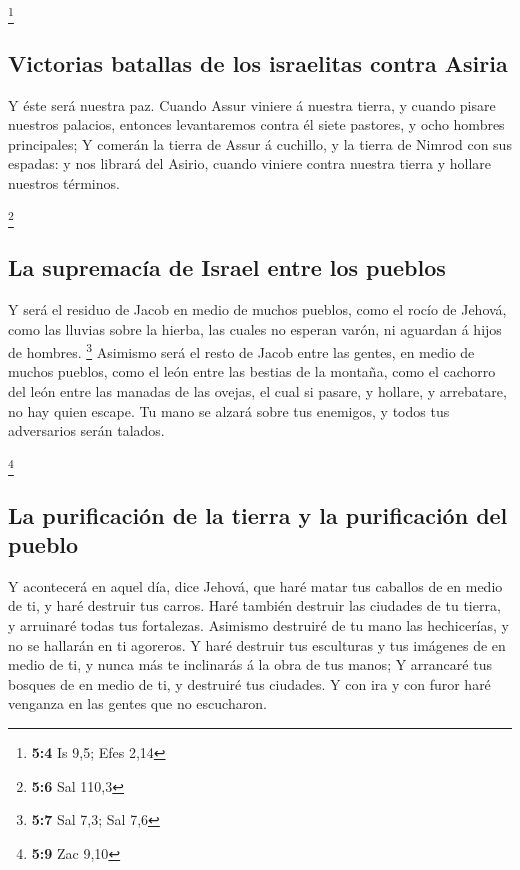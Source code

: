 \footnote{\textbf{5:4} Is 9,5; Efes 2,14}

\hypertarget{victorias-batallas-de-los-israelitas-contra-asiria}{%
\subsection{Victorias batallas de los israelitas contra
Asiria}\label{victorias-batallas-de-los-israelitas-contra-asiria}}

 Y éste será nuestra paz. Cuando Assur viniere á nuestra
tierra, y cuando pisare nuestros palacios, entonces levantaremos contra
él siete pastores, y ocho hombres principales;  Y comerán la
tierra de Assur á cuchillo, y la tierra de Nimrod con sus espadas: y nos
librará del Asirio, cuando viniere contra nuestra tierra y hollare
nuestros términos.

\footnote{\textbf{5:6} Sal 110,3}

\hypertarget{la-supremacuxeda-de-israel-entre-los-pueblos}{%
\subsection{La supremacía de Israel entre los
pueblos}\label{la-supremacuxeda-de-israel-entre-los-pueblos}}

 Y será el residuo de Jacob en medio de muchos pueblos, como
el rocío de Jehová, como las lluvias sobre la hierba, las cuales no
esperan varón, ni aguardan á hijos de hombres. \footnote{\textbf{5:7}
  Sal 7,3; Sal 7,6}  Asimismo será el resto de Jacob entre
las gentes, en medio de muchos pueblos, como el león entre las bestias
de la montaña, como el cachorro del león entre las manadas de las
ovejas, el cual si pasare, y hollare, y arrebatare, no hay quien escape.
 Tu mano se alzará sobre tus enemigos, y todos tus
adversarios serán talados.

\footnote{\textbf{5:9} Zac 9,10}

\hypertarget{la-purificaciuxf3n-de-la-tierra-y-la-purificaciuxf3n-del-pueblo}{%
\subsection{La purificación de la tierra y la purificación del
pueblo}\label{la-purificaciuxf3n-de-la-tierra-y-la-purificaciuxf3n-del-pueblo}}

 Y acontecerá en aquel día, dice Jehová, que haré matar tus
caballos de en medio de ti, y haré destruir tus carros. 
Haré también destruir las ciudades de tu tierra, y arruinaré todas tus
fortalezas.  Asimismo destruiré de tu mano las hechicerías,
y no se hallarán en ti agoreros.  Y haré destruir tus
esculturas y tus imágenes de en medio de ti, y nunca más te inclinarás á
la obra de tus manos;  Y arrancaré tus bosques de en medio
de ti, y destruiré tus ciudades.  Y con ira y con furor
haré venganza en las gentes que no escucharon.

